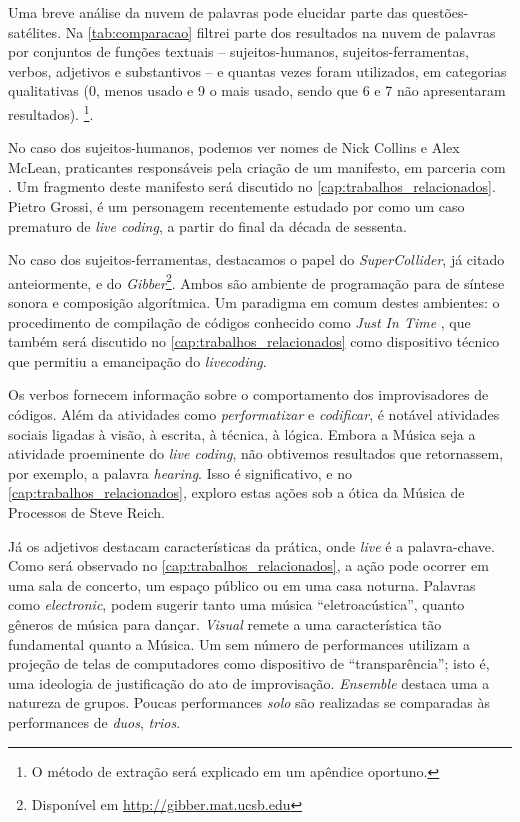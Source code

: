 Uma breve análise da nuvem de palavras pode elucidar parte das questões-satélites. Na \autoref{tab:comparacao} filtrei parte dos resultados na nuvem de palavras por conjuntos de funções textuais -- sujeitos-humanos, sujeitos-ferramentas, verbos, adjetivos e substantivos -- e quantas vezes foram utilizados, em categorias qualitativas (0, menos usado e 9 o mais usado, sendo que 6 e 7 não apresentaram resultados). \footnote{O método de extração será explicado em um apêndice oportuno.}. 

No caso dos sujeitos-humanos, podemos ver nomes de Nick Collins e Alex McLean, praticantes responsáveis pela criação de um manifesto, em parceria com . Um fragmento deste manifesto será discutido no \autoref{cap:trabalhos_relacionados}. Pietro Grossi, é um personagem recentemente estudado por  como um caso prematuro de \emph{live coding}, a partir do final da década de sessenta.

No caso dos sujeitos-ferramentas, destacamos o papel do \emph{SuperCollider}, já citado anteiormente, e do \emph{Gibber}\cite{roberts_gibber:_2012,wyse_viability_2014}\footnote{Disponível em \url{http://gibber.mat.ucsb.edu}}. Ambos são ambiente de programação para de síntese sonora e composição algorítmica. Um paradigma em comum destes ambientes: o procedimento de compilação de códigos conhecido como \emph{Just In Time} \cite{aycock_brief_2003}, que também será discutido no \autoref{cap:trabalhos_relacionados} como dispositivo técnico que permitiu a emancipação do \emph{livecoding}.

Os verbos fornecem informação sobre o comportamento dos improvisadores de códigos. Além da atividades como \emph{performatizar} e \emph{codificar}, é notável atividades sociais ligadas à visão, à escrita, à técnica, à lógica. Embora a Música seja a atividade proeminente do \emph{live coding}, não obtivemos resultados que retornassem, por exemplo, a palavra \emph{hearing}. Isso é significativo, e no \autoref{cap:trabalhos_relacionados}, exploro estas ações sob a ótica da Música de Processos de Steve Reich.

Já os adjetivos destacam características da prática, onde \emph{live} é a palavra-chave. Como será observado no \autoref{cap:trabalhos_relacionados}, a ação pode ocorrer em uma sala de concerto, um espaço público ou em uma casa noturna. Palavras como  \emph{electronic}, podem sugerir tanto uma música ``eletroacústica'', quanto gêneros de música para dançar. \emph{Visual} remete a uma característica tão fundamental quanto a Música. Um sem número de performances utilizam a projeção de telas de computadores como dispositivo de ``transparência''; isto é, uma ideologia de justificação do ato de improvisação. \emph{Ensemble} destaca uma a natureza de grupos. Poucas performances \emph{solo} são realizadas se comparadas às performances de \emph{duos}, \emph{trios}. 

